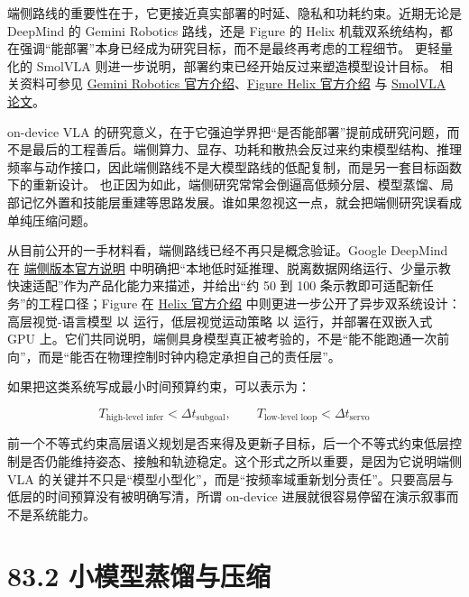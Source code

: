 端侧路线的重要性在于，它更接近真实部署的时延、隐私和功耗约束。近期无论是 DeepMind 的 Gemini Robotics 路线，还是 Figure 的 Helix 机载双系统结构，都在强调“能部署”本身已经成为研究目标，而不是最终再考虑的工程细节。 更轻量化的 SmolVLA 则进一步说明，部署约束已经开始反过来塑造模型设计目标。 相关资料可参见 \href{https://deepmind.google/blog/gemini-robotics-brings-ai-into-the-physical-world/}{Gemini Robotics 官方介绍}、\href{https://www.figure.ai/news/helix}{Figure Helix 官方介绍} 与 \href{https://arxiv.org/abs/2506.01844}{SmolVLA 论文}。

on-device VLA 的研究意义，在于它强迫学界把“是否能部署”提前成研究问题，而不是最后的工程善后。端侧算力、显存、功耗和散热会反过来约束模型结构、推理频率与动作接口，因此端侧路线不是大模型路线的低配复制，而是另一套目标函数下的重新设计。 也正因为如此，端侧研究常常会倒逼高低频分层、模型蒸馏、局部记忆外置和技能层重建等思路发展。谁如果忽视这一点，就会把端侧研究误看成单纯压缩问题。

从目前公开的一手材料看，端侧路线已经不再只是概念验证。Google DeepMind 在 \href{https://deepmind.google/blog/gemini-robotics-on-device-brings-ai-to-local-robotic-devices/}{端侧版本官方说明} 中明确把“本地低时延推理、脱离数据网络运行、少量示教快速适配”作为产品化能力来描述，并给出“约 50 到 100 条示教即可适配新任务”的工程口径；Figure 在 \href{https://www.figure.ai/news/helix}{Helix 官方介绍} 中则更进一步公开了异步双系统设计：高层视觉-语言模型 \texttt{} 以 \texttt{} 运行，低层视觉运动策略 \texttt{} 以 \texttt{} 运行，并部署在双嵌入式 GPU 上。它们共同说明，端侧具身模型真正被考验的，不是“能不能跑通一次前向”，而是“能否在物理控制时钟内稳定承担自己的责任层”。

如果把这类系统写成最小时间预算约束，可以表示为：

\begingroup
\scriptsize
\begin{equation*}
T_{\text{high-level infer}} < \Delta t_{\text{subgoal}}, \qquad
T_{\text{low-level loop}} < \Delta t_{\text{servo}}
\end{equation*}
\endgroup

前一个不等式约束高层语义规划是否来得及更新子目标，后一个不等式约束低层控制是否仍能维持姿态、接触和轨迹稳定。这个形式之所以重要，是因为它说明端侧 VLA 的关键并不只是“模型小型化”，而是“按频率域重新划分责任”。只要高层与低层的时间预算没有被明确写清，所谓 on-device 进展就很容易停留在演示叙事而不是系统能力。

\section*{83.2 小模型蒸馏与压缩}


